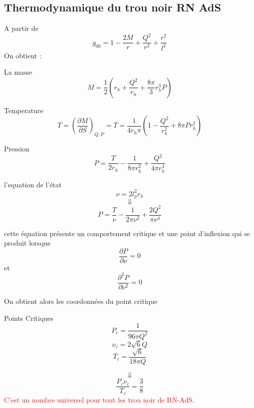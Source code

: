 \documentclass{beamer}
\begin{document}
\subsection{Thermodynamique du trou noir RN AdS}
\begin{frame}
A partir de 
$$g_{00}=1-\dfrac{2M}{r}+\dfrac{Q^{2}}{r^{2}}+\dfrac{r^{2}}{l^{2}}$$
On obtient :
\begin{block}{La masse}
$$M=\dfrac{1}{2} \left( r_{h}+\dfrac{Q^{2}}{r_{h}}+\dfrac{8\pi}{3}r_{h}^{3}P\right)$$
\end{block}
\begin{block}{Temperature}
$$T=(\dfrac{\partial M}{\partial S})_{Q,P}=T=\dfrac{1}{4r_{h}\pi}(1-\dfrac{Q^{2}}{r_{h}^{2}}+8\pi Pr_{h}^{2})$$
\end{block}
\begin{block}{Pression}
$$P=\dfrac{T}{2r_{h}}-\dfrac{1}{8\pi r_{h}^{2}}+\dfrac{Q^{2}}{4\pi r_{h}^{4}}$$
\end{block}

\end{frame}
\begin{frame}
\begin{block}{l'equation de l'état}
$$\nu=2l_{p}^{2}r_{h}$$ $$\Downarrow$$ $$P=\dfrac{T}{\nu}-\dfrac{1}{2\pi \nu^{2}}+\dfrac{2Q^{2}}{\pi \nu^{4}}$$
\end{block} 
cette équation présente un comportement
critique et une point d'inflexion qui se produit lorsque 
$$\dfrac{\partial P}{\partial \nu}=0 $$ et $$\dfrac{\partial^{2} P}{\partial \nu^{2}}=0$$ 
\end{frame}
\begin{frame}
On obtient alors les coordonnées du point critique
\begin{block}{Points Critiques}
$$P_{c}=\dfrac{1}{96\pi Q^{2}}$$
$$\nu_{c}=2\sqrt{6}Q$$
$$T_{c}=\dfrac{\sqrt{6}}{18\pi Q}$$
\end{block}


$$\Downarrow$$
$$\dfrac{P_{c}\nu_{c}}{T_{c}}=\dfrac{3}{8}$$
 \textcolor{red}{C'est un nombre universel
 	pour tout les trou noir de RN-AdS}.

\end{frame}
\end{document}
